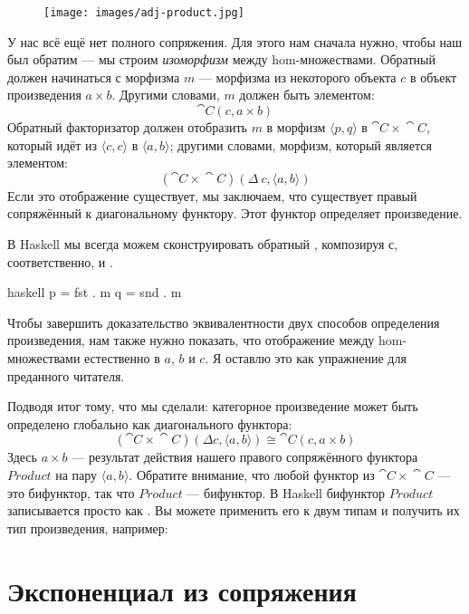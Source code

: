\begin{figure}[H]
  \centering
  \texttt{[image: images/adj-product.jpg]}
\end{figure}

\noindent
У нас всё ещё нет полного сопряжения. Для этого нам сначала нужно, чтобы наш
 был обратим --- мы строим
\emph{изоморфизм} между hom-множествами. Обратный
 должен начинаться с морфизма $m$ ---
морфизма из некоторого объекта $c$ в объект произведения $a\times{}b$.
Другими словами, $m$ должен быть элементом:
\[\cat{C}(c, a\times{}b)\]
Обратный факторизатор должен отобразить $m$ в морфизм
$\langle p, q \rangle$ в $\cat{C}\times{}\cat{C}$, который идёт из
$\langle c, c \rangle$ в
$\langle a, b \rangle$; другими словами, морфизм,
который является элементом:
\[(\cat{C}\times{}\cat{C})(\Delta\ c, \langle a, b \rangle)\]
Если это отображение существует, мы заключаем, что существует правый сопряжённый
к диагональному функтору. Этот функтор определяет произведение.

В Haskell мы всегда можем сконструировать обратный
, композируя  с, соответственно,
 и .

\begin{snip}{haskell}
p = fst . m
q = snd . m
\end{snip}
Чтобы завершить доказательство эквивалентности двух способов определения
произведения, нам также нужно показать, что отображение между hom-множествами
естественно в $a$, $b$ и $c$. Я оставлю это как
упражнение для преданного читателя.

Подводя итог тому, что мы сделали: категорное произведение может быть определено
глобально как  диагонального функтора:
\[(\cat{C}\times{}\cat{C})(\Delta c, \langle a, b \rangle) \cong \cat{C}(c, a\times{}b)\]
Здесь $a\times{}b$ --- результат действия нашего правого сопряжённого
функтора $\mathit{Product}$ на пару
$\langle a, b \rangle$. Обратите внимание, что любой функтор из
$\cat{C}\times{}\cat{C}$ --- это бифунктор, так что $\mathit{Product}$ --- бифунктор. В
Haskell бифунктор $\mathit{Product}$ записывается просто как
\code{(,)}. Вы можете применить его к двум типам и получить их тип произведения,
например:


\section{Экспоненциал из сопряжения}

